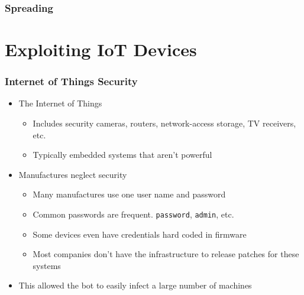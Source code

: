 \documentclass{beamer}
\begin{document}
\begin{frame}
	\frametitle{Spreading}
	
\end{frame}

\section{Exploiting IoT Devices}

\begin{frame}[fragile]
	\frametitle{Internet of Things Security}
	\begin{itemize}
		\item<+-> The Internet of Things
		\begin{itemize}
			\item<+-> Includes security cameras, routers, network-access storage, TV receivers, etc.
			\item<+-> Typically embedded systems that aren't powerful
		\end{itemize}
		\item<+-> Manufactures neglect security
		\begin{itemize}
			\item<+-> Many manufactures use one user name and password
			\item<+-> Common passwords are frequent. \verb|password|, \verb|admin|, etc.
			\item<+-> Some devices even have credentials hard coded in firmware
			\item<+-> Most companies don't have the infrastructure to release patches for these systems
		\end{itemize}
		\item<+-> This allowed the bot to easily infect a large number of machines
	\end{itemize}
\end{frame}
\end{document}
